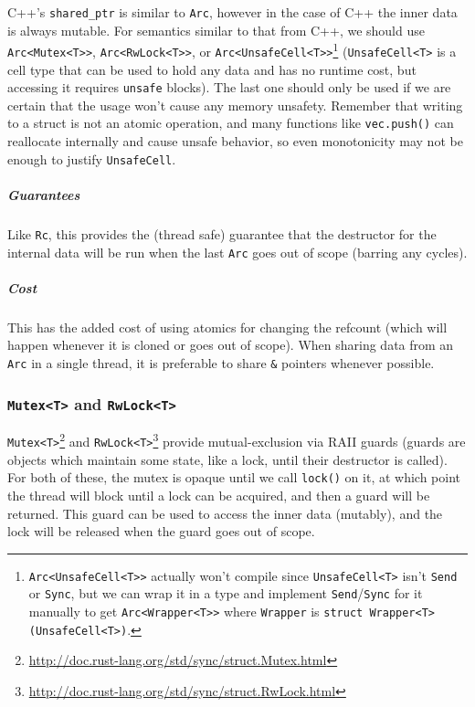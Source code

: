 \documentclass[a4paper,]{book}
\renewcommand{\href}[2]{#2\footnote{\url{#1}}}
\let\oldsubparagraph\subparagraph
\renewcommand{\subparagraph}[1]{\oldsubparagraph{#1}\mbox{}}
\begin{document}
C++'s \texttt{shared\_ptr} is similar to \texttt{Arc}, however in the
case of C++ the inner data is always mutable. For semantics similar to
that from C++, we should use
\texttt{Arc\textless{}Mutex\textless{}T\textgreater{}\textgreater{}},
\texttt{Arc\textless{}RwLock\textless{}T\textgreater{}\textgreater{}},
or
\texttt{Arc\textless{}UnsafeCell\textless{}T\textgreater{}\textgreater{}}\footnote{\texttt{Arc\textless{}UnsafeCell\textless{}T\textgreater{}\textgreater{}}
  actually won't compile since
  \texttt{UnsafeCell\textless{}T\textgreater{}} isn't \texttt{Send} or
  \texttt{Sync}, but we can wrap it in a type and implement
  \texttt{Send}/\texttt{Sync} for it manually to get
  \texttt{Arc\textless{}Wrapper\textless{}T\textgreater{}\textgreater{}}
  where \texttt{Wrapper} is
  \texttt{struct\ Wrapper\textless{}T\textgreater{}(UnsafeCell\textless{}T\textgreater{})}.}
(\texttt{UnsafeCell\textless{}T\textgreater{}} is a cell type that can
be used to hold any data and has no runtime cost, but accessing it
requires \texttt{unsafe} blocks). The last one should only be used if we
are certain that the usage won't cause any memory unsafety. Remember
that writing to a struct is not an atomic operation, and many functions
like \texttt{vec.push()} can reallocate internally and cause unsafe
behavior, so even monotonicity may not be enough to justify
\texttt{UnsafeCell}.

\subparagraph{Guarantees}\label{guarantees-3}

Like \texttt{Rc}, this provides the (thread safe) guarantee that the
destructor for the internal data will be run when the last \texttt{Arc}
goes out of scope (barring any cycles).

\subparagraph{Cost}\label{cost-3}

This has the added cost of using atomics for changing the refcount
(which will happen whenever it is cloned or goes out of scope). When
sharing data from an \texttt{Arc} in a single thread, it is preferable
to share \texttt{\&} pointers whenever possible.

\subsubsection{\texorpdfstring{\texttt{Mutex\textless{}T\textgreater{}}
and
\texttt{RwLock\textless{}T\textgreater{}}}{Mutex\textless{}T\textgreater{} and RwLock\textless{}T\textgreater{}}}\label{mutext-and-rwlockt}

\href{http://doc.rust-lang.org/std/sync/struct.Mutex.html}{\texttt{Mutex\textless{}T\textgreater{}}}
and
\href{http://doc.rust-lang.org/std/sync/struct.RwLock.html}{\texttt{RwLock\textless{}T\textgreater{}}}
provide mutual-exclusion via RAII guards (guards are objects which
maintain some state, like a lock, until their destructor is called). For
both of these, the mutex is opaque until we call \texttt{lock()} on it,
at which point the thread will block until a lock can be acquired, and
then a guard will be returned. This guard can be used to access the
inner data (mutably), and the lock will be released when the guard goes
out of scope.
\end{document}
